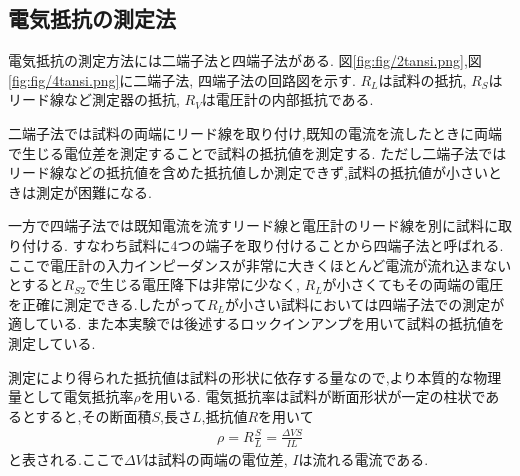 \subsection{電気抵抗の測定法}
電気抵抗の測定方法には二端子法と四端子法がある.
図\ref{fig:fig/2tansi.png},図\ref{fig:fig/4tansi.png}に二端子法, 四端子法の回路図を示す.
$R_L$は試料の抵抗, $R_S$はリード線など測定器の抵抗, $R_V$は電圧計の内部抵抗である.

二端子法では試料の両端にリード線を取り付け,既知の電流を流したときに両端で生じる電位差を測定することで試料の抵抗値を測定する.
ただし二端子法ではリード線などの抵抗値を含めた抵抗値しか測定できず,試料の抵抗値が小さいときは測定が困難になる.

一方で四端子法では既知電流を流すリード線と電圧計のリード線を別に試料に取り付ける.
すなわち試料に4つの端子を取り付けることから四端子法と呼ばれる.
ここで電圧計の入力インピーダンスが非常に大きくほとんど電流が流れ込まないとすると$R_{S2}$で生じる電圧降下は非常に少なく,
$R_L$が小さくてもその両端の電圧を正確に測定できる.したがって$R_L$が小さい試料においては四端子法での測定が適している.
また本実験では後述するロックインアンプを用いて試料の抵抗値を測定している.

測定により得られた抵抗値は試料の形状に依存する量なので,より本質的な物理量として電気抵抗率$\rho$を用いる.
電気抵抗率は試料が断面形状が一定の柱状であるとすると,その断面積$S$,長さ$L$,抵抗値$R$を用いて
\begin{align}
  \rho=R\frac{S}{L}=\frac{\Delta VS}{IL}
\end{align}
と表される.ここで$\Delta V$は試料の両端の電位差, $I$は流れる電流である.
\clearpage
{}

